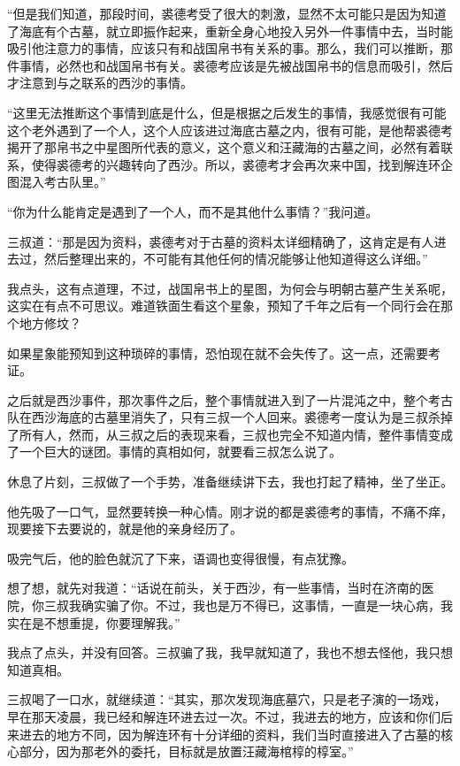 “但是我们知道，那段时间，裘德考受了很大的刺激，显然不太可能只是因为知道了海底有个古墓，就立即振作起来，重新全身心地投入另外一件事情中去，当时能吸引他注意力的事情，应该只有和战国帛书有关系的事。那么，我们可以推断，那件事情，必然也和战国帛书有关。裘德考应该是先被战国帛书的信息而吸引，然后才注意到与之联系的西沙的事情。

“这里无法推断这个事情到底是什么，但是根据之后发生的事情，我感觉很有可能这个老外遇到了一个人，这个人应该进过海底古墓之内，很有可能，是他帮裘德考揭开了那帛书之中星图所代表的意义，这个意义和汪藏海的古墓之间，必然有着联系，使得裘德考的兴趣转向了西沙。所以，裘德考才会再次来中国，找到解连环企图混入考古队里。”

“你为什么能肯定是遇到了一个人，而不是其他什么事情？”我问道。

三叔道：“那是因为资料，裘德考对于古墓的资料太详细精确了，这肯定是有人进去过，然后整理出来的，不可能有其他任何的情况能够让他知道得这么详细。”

我点头，这有点道理，不过，战国帛书上的星图，为何会与明朝古墓产生关系呢，这实在有点不可思议。难道铁面生看这个星象，预知了千年之后有一个同行会在那个地方修坟？

如果星象能预知到这种琐碎的事情，恐怕现在就不会失传了。这一点，还需要考证。

之后就是西沙事件，那次事件之后，整个事情就进入到了一片混沌之中，整个考古队在西沙海底的古墓里消失了，只有三叔一个人回来。裘德考一度认为是三叔杀掉了所有人，然而，从三叔之后的表现来看，三叔也完全不知道内情，整件事情变成了一个巨大的谜团。事情的真相如何，就要看三叔怎么说了。

休息了片刻，三叔做了一个手势，准备继续讲下去，我也打起了精神，坐了坐正。

他先吸了一口气，显然要转换一种心情。刚才说的都是裘德考的事情，不痛不痒，现要接下去要说的，就是他的亲身经历了。

吸完气后，他的脸色就沉了下来，语调也变得很慢，有点犹豫。

想了想，就先对我道：“话说在前头，关于西沙，有一些事情，当时在济南的医院，你三叔我确实骗了你。不过，我也是万不得已，这事情，一直是一块心病，我实在是不想重提，你要理解我。”

我点了点头，并没有回答。三叔骗了我，我早就知道了，我也不想去怪他，我只想知道真相。

三叔喝了一口水，就继续道：“其实，那次发现海底墓穴，只是老子演的一场戏，早在那天凌晨，我已经和解连环进去过一次。不过，我进去的地方，应该和你们后来进去的地方不同，因为解连环有十分详细的资料，我们当时直接进入了古墓的核心部分，因为那老外的委托，目标就是放置汪藏海棺椁的椁室。”

